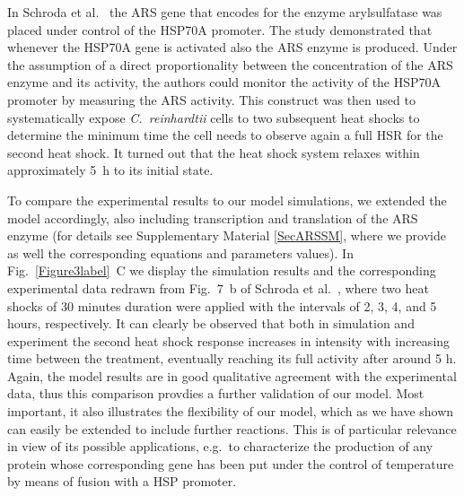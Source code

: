 \documentclass[oneside, 10pt, a4paper, twocolumn]{article}
\begin{document}


In Schroda et al.~\cite{Schroda2000} the ARS gene that encodes for the enzyme arylsulfatase 
was placed under control
of the HSP70A promoter. The study demonstrated that whenever the HSP70A gene is activated also the ARS enzyme is produced.
Under the assumption of a direct proportionality between the concentration of the ARS enzyme and its activity, 
the authors could monitor the activity of the HSP70A promoter by measuring the ARS activity.
This construct was then used to systematically expose \textit{C.~reinhardtii} cells to two
subsequent heat shocks to determine the minimum time
the cell needs to observe again a full HSR for the second heat shock.
It turned out that the heat shock system relaxes within approximately  5~h to its initial state.

To compare the experimental results to our model simulations, we extended the model
accordingly, also including transcription and translation of the ARS enzyme (for details see Supplementary Material \ref{SecARSSM}, where we provide as well the corresponding equations and parameters values). %
In Fig.~\ref{Figure3label}~C we display the simulation results and the corresponding experimental data redrawn from Fig.~7~b of Schroda et al.~\cite{Schroda2000}, where two heat shocks of 30 minutes duration were 
applied with the intervals of 2, 3, 4, and 5 hours, respectively. 
It can clearly be observed that both in simulation and experiment the second heat shock response
increases in intensity with increasing time between the treatment, eventually reaching
its full activity after around 5 h. Again, the model results are in good qualitative 
agreement with the experimental data, thus this comparison provdies a further validation of our model. Most important, it also illustrates the flexibility of our model, which as we have shown can easily be extended to include further reactions. This is of particular relevance in view of its possible applications, e.g.~to characterize the production of any protein whose corresponding gene has been put under the control of temperature by means of fusion with a HSP promoter.
\end{document}
